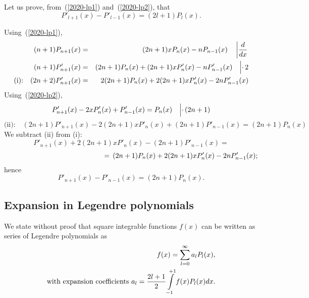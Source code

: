 Let us prove, from~(\ref{2020-lp1}) and~(\ref{2020-lp2}), that
\begin{equation}
P'_{l+1}(x)-P'_{l-1}(x)=(2l+1)P_l(x) .
\end{equation}

{\color{OliveGreen}
\bproof
Using~(\ref{2020-lp1}),
\begin{eqnarray*}
   (n+1)P_{n+1}(x)&=&(2n+1)xP_n(x)-nP_{n-1}(x)\quad\left|
   {d\over dx}\right.\\
   (n+1)P'_{n+1}(x)&=&(2n+1)P_n(x)+(2n+1)xP'_n(x)-nP'_{n-1}(x)
   \quad\Bigl|\cdot\,2\\
   \textrm{(i):}\quad(2n+2)P'_{n+1}(x)&=&2(2n+1)P_n(x)+2(2n+1)xP'_n(x)-2nP'_{n-1}(x)
\end{eqnarray*}
Using~(\ref{2020-lp2}),
$$
   P'_{n+1}(x)-2xP'_{n}(x)+P'_{n-1}(x)=P_{n}(x)\quad\Bigl|
   \cdot\,(2n+1)
$$
$$
   \textrm{(ii):}\quad (2n+1)P'_{n+1}(x)-2(2n+1)xP'_{n}(x)+(2n+1)P'_{n-1}(x)=
   (2n+1)P_{n}(x)
$$
We subtract (ii) from (i):
$$
   P'_{n+1}(x)+2(2n+1)xP'_n(x)-(2n+1)P'_{n-1}(x)=
$$
$$
   \hspace*{5cm}=\,(2n+1)P_n(x)+2(2n+1)xP'_n(x)-2nP'_{n-1}(x);
$$
hence
$$
   P'_{n+1}(x)-P'_{n-1}(x)=(2n+1)P_n(x).
$$
\eproof
}

\subsection{Expansion in Legendre polynomials}

We state without proof  that square integrable functions $f(x)$
can be written as series of Legendre polynomials
as
\begin{equation}
\begin{split}
 f(x)=\sum_{l=0}^\infty a_lP_l(x),\\
\textrm{with expansion coefficients } a_l={2l+1\over 2}
\int\limits_{-1}^{+1}f(x)P_l(x)dx.
 \end{split}
\end{equation}

